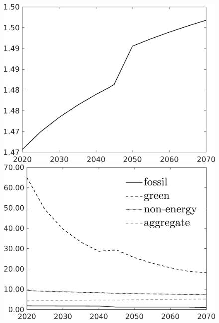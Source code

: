 \begin{figure}[h!!]
\begin{minipage}[]{0.32\textwidth}
	\end{minipage}
	\begin{minipage}[]{0.32\textwidth}
		\includegraphics[width=1\textwidth]{../../codding_model/own_basedOnFried/optimalPol_190722_tidiedUp/figures/all_10Aout22/Single_OPT_T_NoTaus_hhhl_regime3_spillover0_noskill0_sep1_xgrowth0_extern0_etaa0.79.png}
	\end{minipage}
	\begin{minipage}[]{0.32\textwidth}
		\includegraphics[width=1\textwidth]{../../codding_model/own_basedOnFried/optimalPol_190722_tidiedUp/figures/all_10Aout22/SingleJointTOT_regime3_OPT_T_NoTaus_Growth_spillover0_noskill0_sep1_xgrowth0_extern0_PV1_etaa0.79_lgd1.png}

\end{minipage}
\end{figure}
